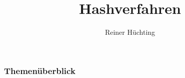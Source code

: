 

\title{Hashverfahren}
\author{Reiner Hüchting}


    \begin{frame}
        \titlepage
    \end{frame}

    \begin{frame}
        \frametitle{Themenüberblick}
        \tableofcontents[hideallsubsections]
    \end{frame}


